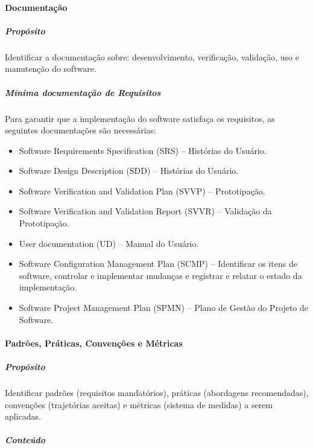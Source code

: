 \paragraph{Documentação}

\subparagraph{Propósito}

Identificar a documentação sobre: desenvolvimento, verificação, validação, uso e manutenção do software.

\subparagraph{Mínima documentação de Requisitos}

Para garantir que a implementação do software satisfaça os requisitos, as seguintes documentações são necessárias:

\begin{itemize}
\item Software Requirements Specification (SRS) – Histórias do Usuário.

\item Software Design Description (SDD) – Histórias do Usuário.

\item Software Verification and Validation Plan (SVVP) – Prototipação.

\item Software Verification and Validation Report (SVVR) – Validação da Prototipação.

\item User documentation (UD) – Manual do Usuário.

\item Software Configuration Management Plan (SCMP) – Identificar os itens de software, controlar e implementar mudanças e registrar e relatar o estado da implementação.

\item Software Project Management Plan (SPMN) – Plano de Gestão do Projeto de Software.

\end{itemize}

\paragraph{Padrões, Práticas, Convenções e Métricas}

\subparagraph{Propósito}

Identificar padrões (requisitos mandatórios), práticas (abordagens recomendadas), convenções (trajetórias aceitas) e métricas (sistema de medidas) a serem aplicadas.

\subparagraph{Conteúdo} 

